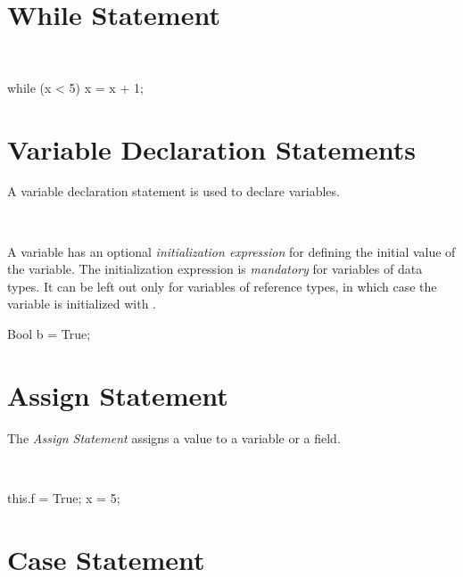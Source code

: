 \section{While Statement}

\begin{abssyntax}
\ \TRS{(}  \TRS{)}\ 
\end{abssyntax}

\begin{absexample}
while (x < 5)
   x = x + 1;
\end{absexample}

\section{Variable Declaration Statements}
A variable declaration statement is used to declare variables.

\begin{abssyntax}
  {}\ \ \ \TRS{;}
\end{abssyntax}

A variable has an optional \emph{initialization expression} for defining the initial value of the variable. The initialization expression is \emph{mandatory} for variables of data types.
It can be left out only for variables of reference types, in which case the variable is initialized with .

\begin{absexample}
Bool b = True;
\end{absexample}

\section{Assign Statement}
The \emph{Assign Statement} assigns a value to a variable or a field.

\begin{abssyntax}
  {}\ \TRS{=}\ \ \TRS{;}
               {}\ \TRS{=}\ \ \TRS{;}
\end{abssyntax}

\begin{absexample}
this.f = True;
x = 5;
\end{absexample}

\section{Case Statement}

